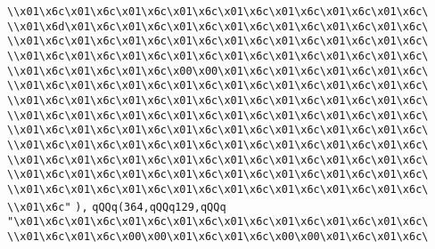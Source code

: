 \verb|\\x01\x6c\x01\x6c\x01\x6c\x01\x6c\x01\x6c\x01\x6c\x01\x6c\x01\x6c\|\newline
\verb|\\x01\x6d\x01\x6c\x01\x6c\x01\x6c\x01\x6c\x01\x6c\x01\x6c\x01\x6c\|\newline
\verb|\\x01\x6c\x01\x6c\x01\x6c\x01\x6c\x01\x6c\x01\x6c\x01\x6c\x01\x6c\|\newline
\verb|\\x01\x6c\x01\x6c\x01\x6c\x01\x6c\x01\x6c\x01\x6c\x01\x6c\x01\x6c\|\newline
\verb|\\x01\x6c\x01\x6c\x01\x6c\x00\x00\x01\x6c\x01\x6c\x01\x6c\x01\x6c\|\newline
\verb|\\x01\x6c\x01\x6c\x01\x6c\x01\x6c\x01\x6c\x01\x6c\x01\x6c\x01\x6c\|\newline
\verb|\\x01\x6c\x01\x6c\x01\x6c\x01\x6c\x01\x6c\x01\x6c\x01\x6c\x01\x6c\|\newline
\verb|\\x01\x6c\x01\x6c\x01\x6c\x01\x6c\x01\x6c\x01\x6c\x01\x6c\x01\x6c\|\newline
\verb|\\x01\x6c\x01\x6c\x01\x6c\x01\x6c\x01\x6c\x01\x6c\x01\x6c\x01\x6c\|\newline
\verb|\\x01\x6c\x01\x6c\x01\x6c\x01\x6c\x01\x6c\x01\x6c\x01\x6c\x01\x6c\|\newline
\verb|\\x01\x6c\x01\x6c\x01\x6c\x01\x6c\x01\x6c\x01\x6c\x01\x6c\x01\x6c\|\newline
\verb|\\x01\x6c\x01\x6c\x01\x6c\x01\x6c\x01\x6c\x01\x6c\x01\x6c\x01\x6c\|\newline
\verb|\\x01\x6c\x01\x6c\x01\x6c\x01\x6c\x01\x6c\x01\x6c\x01\x6c\x01\x6c\|\newline
\verb|\\x01\x6c"|\newline
\verb|),|\newline
\verb|qQQq(364,qQQq129,qQQq|\newline
\verb|"\x01\x6c\x01\x6c\x01\x6c\x01\x6c\x01\x6c\x01\x6c\x01\x6c\x01\x6c\|\newline
\verb|\\x01\x6c\x01\x6c\x00\x00\x01\x6c\x01\x6c\x00\x00\x01\x6c\x01\x6c\|\newline
